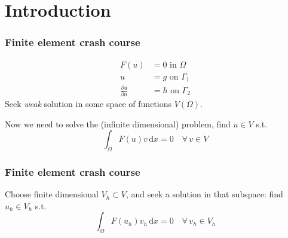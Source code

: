 \documentclass[presentation]{beamer}
\begin{document}
\section{Introduction}
\begin{frame}
  \frametitle{Finite element crash course}
  \begin{align*}
    F(u) &= 0 \text{ in $\Omega$}\\
    u &= g \text{ on $\Gamma_1$}\\
    \frac{\partial u}{\partial n} &= h \text{ on $\Gamma_2$}
  \end{align*}
  Seek \emph{weak} solution in some space of functions $V(\Omega)$.

  Now we need to solve the (infinite dimensional) problem, find $u\in V$ s.t.
  \begin{equation*}
    \int_\Omega \!F(u) v\, \text{d}x = 0 \quad \forall\, v \in V
  \end{equation*}
\end{frame}
\begin{frame}
  \frametitle{Finite element crash course}
  Choose finite dimensional $V_h \subset V$, and seek a solution in
  that subspace: find $u_h \in V_h$ s.t.
  \begin{equation*}
    \int_\Omega \!F(u_h) v_h\, \text{d}x = 0 \quad \forall\, v_h \in V_h
  \end{equation*}
\end{frame}
\end{document}
